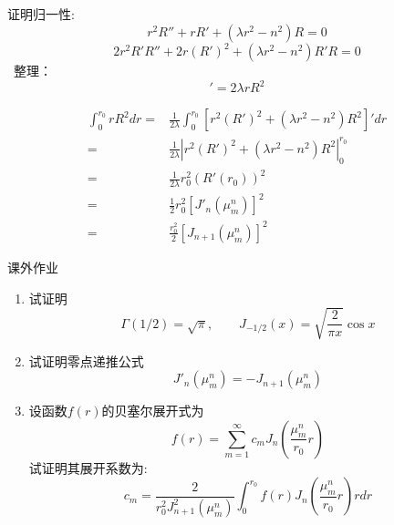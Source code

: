 	证明归一性:
	\begin{equation*}
		r^2 R''+r R' +(\lambda r^2 -n^2)R=0 
	\end{equation*}	
	\begin{equation*}
		2r^2 R'R''+2r (R')^2 +(\lambda r^2 -n^2)R'R=0 
	\end{equation*}	
	 整理：
	\begin{equation*}
		[r^2 (R')^2 + (\lambda r^2 -n^2)R^2]'=2 \lambda rR^2
	\end{equation*}	



	\begin{equation*}
		\begin{split}
			\int_0 ^{r_0} r R^2 dr =& \frac{1}{2\lambda} \int_0 ^{r_0} [r^2 (R')^2 + (\lambda r^2 -n^2)R^2]' dr  \\
			=& \frac{1}{2\lambda} |r^2 (R')^2 + (\lambda r^2 -n^2)R^2 |_0 ^{r_0} \\
			=& \frac{1}{2\lambda} r_0^2 (R'(r_0))^2 \\
			=& \frac{1}{2} r_0^2 [J'_n(\mu_m ^n)]^2 \\
			=& \frac{r_0^2}{2} [J_{n+1}(\mu_m ^n)]^2
		\end{split}
	\end{equation*}	




	{课外作业}
	\begin{enumerate}
		\item 试证明
		\begin{equation*}
			\Gamma(1/2)=\sqrt{\pi}, \qquad J_{-1/2}(x) = \sqrt{\frac{2}{\pi x}} \cos x  
		\end{equation*}
		\item 试证明零点递推公式  \[ J'_n(\mu_m ^n)= - J_{n+1}(\mu_m ^n)\]
		\item 设函数$f(r)$的贝塞尔展开式为
		\begin{equation*}
			f(r)=\sum_{m=1}^\infty c_m J_n(\frac{\mu_m ^n}{r_0} r)
		\end{equation*}	
		试证明其展开系数为: 
		\begin{equation*}
			c_m=\frac{2} {r^2_0 J_{n+1} ^2 (\mu_m ^n)} \int_0 ^{r_0} f(r) J_n(\frac{\mu_m ^n}{r_0} r) r dr 
		\end{equation*}	
	\end{enumerate}


